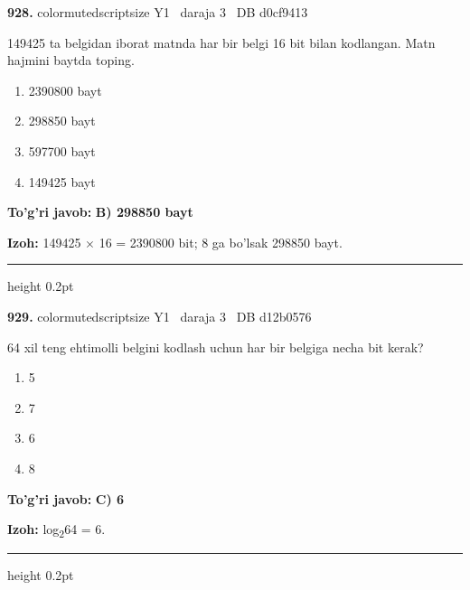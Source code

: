\documentclass[10pt,a4paper,oneside]{article}
\begin{document}
\noindent\textbf{\color{ink}928.}  {color{muted}scriptsize Y1 \textbullet\ daraja 3 \textbullet\ DB d0cf9413}
\par
149425 ta belgidan iborat matnda har bir belgi 16 bit bilan kodlangan. Matn hajmini baytda toping.
\begin{enumerate}[label=\Alph*),leftmargin=9mm]
\item 2390800 bayt
\item 298850 bayt
\item 597700 bayt
\item 149425 bayt
\end{enumerate}
\begin{tcolorbox}[enhanced,breakable,colback=teal!4,colframe=teal!50!black,boxrule=0.5pt,arc=1.1mm,left=3mm,right=3mm,top=1.7mm,bottom=1.7mm,before skip=2mm,after skip=2mm]
\textbf{\color{teal}To'g'ri javob:} \textbf{B) 298850 bayt}
\par\smallskip
\textbf{Izoh:} 149425 \ensuremath{\times} 16 = 2390800 bit; 8 ga bo'lsak 298850 bayt.
\end{tcolorbox}
\vspace{2mm}\hrule height 0.2pt \vspace{3mm}

\noindent\textbf{\color{ink}929.}  {color{muted}scriptsize Y1 \textbullet\ daraja 3 \textbullet\ DB d12b0576}
\par
64 xil teng ehtimolli belgini kodlash uchun har bir belgiga necha bit kerak?
\begin{enumerate}[label=\Alph*),leftmargin=9mm]
\item 5
\item 7
\item 6
\item 8
\end{enumerate}
\begin{tcolorbox}[enhanced,breakable,colback=teal!4,colframe=teal!50!black,boxrule=0.5pt,arc=1.1mm,left=3mm,right=3mm,top=1.7mm,bottom=1.7mm,before skip=2mm,after skip=2mm]
\textbf{\color{teal}To'g'ri javob:} \textbf{C) 6}
\par\smallskip
\textbf{Izoh:} log\textsubscript{2}64 = 6.
\end{tcolorbox}
\vspace{2mm}\hrule height 0.2pt \vspace{3mm}
\end{document}
